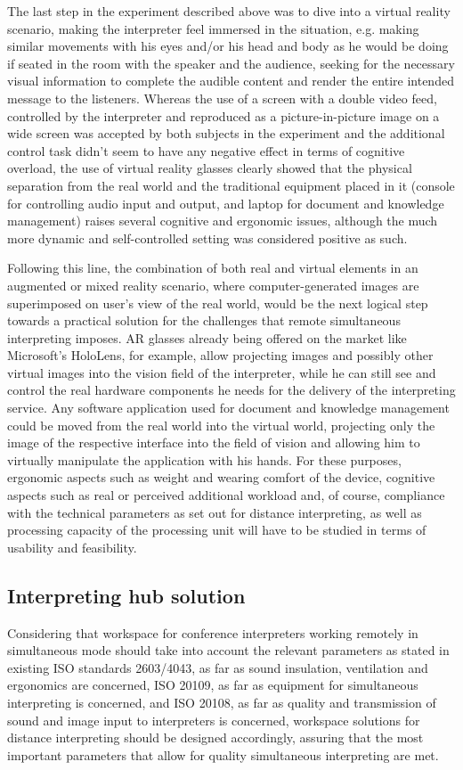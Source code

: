 \documentclass[output=paper]{langsci/langscibook}
\begin{document}
The last step in the experiment described above was to dive into a virtual reality scenario, making the interpreter feel immersed in the situation, e.g. making similar movements with his eyes and/or his head and body as he would be doing if seated in the room with the speaker and the audience, seeking for the necessary visual information to complete the audible content and render the entire intended message to the listeners. Whereas the use of a screen with a double video feed, controlled by the interpreter and reproduced as a picture-in-picture image on a wide screen was accepted by both subjects in the experiment and the additional control task didn’t seem to have any negative effect in terms of cognitive overload, the use of virtual reality glasses clearly showed that the physical separation from the real world and the traditional equipment placed in it (console for controlling audio input and output, and laptop for document and knowledge management) raises several cognitive and ergonomic issues, although the much more dynamic and self-controlled setting was considered positive as such. 

Following this line, the combination of both real and virtual elements in an augmented or mixed reality scenario, where computer-generated images are superimposed on user’s view of the real world, would be the next logical step towards a practical solution for the challenges that remote simultaneous interpreting imposes. \textsc{AR} glasses already being offered on the market like Microsoft’s HoloLens, for example, allow projecting images and possibly other virtual images into the vision field of the interpreter, while he can still see and control the real hardware components he needs for the delivery of the interpreting service. Any software application used for document and knowledge management could be moved from the real world into the virtual world, projecting only the image of the respective interface into the field of vision and allowing him to virtually manipulate the application with his hands. For these purposes, ergonomic aspects such as weight and wearing comfort of the device, cognitive aspects such as real or perceived additional workload and, of course, compliance with the technical parameters as set out for distance interpreting, as well as processing capacity of the processing unit will have to be studied in terms of usability and feasibility.

\subsection{Interpreting hub solution}
\label{sub:ziegler:6.2}
Considering that workspace for conference interpreters working remotely in simultaneous mode should take into account the relevant parameters as stated in existing \textsc{ISO} standards 2603/4043, as far as sound insulation, ventilation and ergonomics are concerned, \textsc{ISO} 20109, as far as equipment for simultaneous interpreting is concerned, and \textsc{ISO} 20108, as far as quality and transmission of sound and image input to interpreters is concerned, workspace solutions for distance interpreting should be designed accordingly, assuring that the most important parameters that allow for quality simultaneous interpreting are met.
\end{document}
